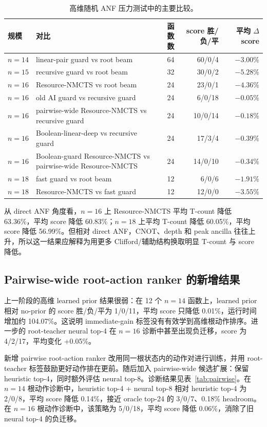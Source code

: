 \documentclass[UTF8,fontset=macnew,11pt]{ctexart}
\newcommand{\method}{Resource-NMCTS}
\begin{document}
\begin{table}[t]
\centering
\small
\caption{高维随机 ANF 压力测试中的主要比较。}
\label{tab:highdim}
\begin{tabularx}{\linewidth}{l>{\raggedright\arraybackslash}Xrrr}
\toprule
规模 & 对比 & 函数数 & score 胜/负/平 & 平均 $\Delta$ score \\
\midrule
$n=14$ & linear-pair guard vs root beam & 64 & 60/0/4 & $-3.00\%$ \\
$n=15$ & recursive guard vs root beam & 32 & 30/0/2 & $-5.28\%$ \\
$n=16$ & \method{} vs root beam & 24 & 23/0/1 & $-4.36\%$ \\
$n=16$ & old AI guard vs recursive guard & 24 & 6/0/18 & $-0.05\%$ \\
$n=16$ & pairwise-wide \method{} vs recursive guard & 24 & 10/0/14 & $-0.18\%$ \\
$n=16$ & Boolean-linear-deep vs recursive guard & 24 & 17/3/4 & $-0.39\%$ \\
$n=16$ & Boolean-guard \method{} vs pairwise-wide \method{} & 24 & 14/0/10 & $-0.34\%$ \\
$n=18$ & fast guard vs root beam & 12 & 6/0/6 & $-1.91\%$ \\
$n=18$ & \method{} vs fast guard & 12 & 12/0/0 & $-3.55\%$ \\
\bottomrule
\end{tabularx}
\end{table}

从 direct ANF 角度看，$n=16$ 上 \method{} 平均 T-count 降低 63.36\%，平均 score 降低 60.83\%；$n=18$ 上平均 T-count 降低 60.05\%，平均 score 降低 56.99\%。但相对 direct ANF，CNOT、depth 和 peak ancilla 往往上升，所以这一结果应解释为用更多 Clifford/辅助结构换取明显 T-count 与 score 降低。

\subsection{Pairwise-wide root-action ranker 的新增结果}

上一阶段的高维 learned prior 结果很弱：在 12 个 $n=14$ 函数上，learned prior 相对 no-prior 的 score 胜/负/平为 1/0/11，平均 score 只降低 0.01\%，运行时间增加约 104.07\%。这说明 immediate-gain 标签没有有效学到高维根动作排序。进一步的 root-teacher neural top-4 在 $n=16$ 诊断中甚至出现负迁移，score 为 4/2/17，平均变化 +0.05\%。

新增 pairwise root-action ranker 改用同一根状态内的动作对进行训练，并用 root-teacher 标签鼓励更好动作排在更前。随后加入 pairwise-wide 候选扩展：保留 heuristic top-4，同时额外评估 neural top-8。诊断结果见表~\ref{tab:pairwise}。在 $n=14$ 根动作诊断中，heuristic top-4 + neural top-8 相对 heuristic top-4 为 2/0/8，平均 score 降低 0.14\%，接近 oracle top-24 的 3/0/7、0.18\% headroom。在 $n=16$ 根动作诊断中，该策略为 5/0/18，平均 score 降低 0.06\%，消除了旧 neural top-4 的负迁移。
\end{document}
